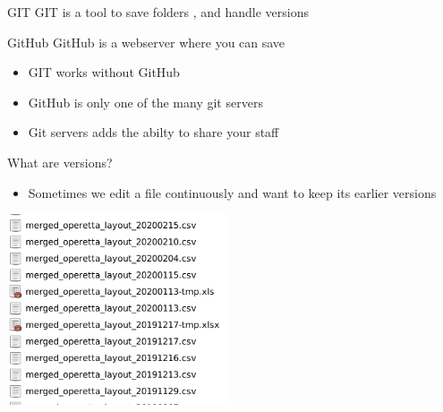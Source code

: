 \documentclass[aspectratio=169]{beamer}
\begin{document}

\begin{frame}

\begin{block}{GIT}
GIT is a  tool to save folders , and handle versions
\end{block}


\begin{block}{GitHub}
GitHub is a webserver where you can save 
\end{block}



\begin{itemize}
\item GIT works without GitHub
\item GitHub is only one of the many git servers
\item Git servers adds the abilty to share your staff
\end{itemize}
 
\end{frame}



\begin{frame}

What are versions? 


\begin{itemize}
\item Sometimes we edit a file continuously and want to keep its earlier versions
\end{itemize}
\includegraphics[height=160pt]{pictures/Screenshot_2020-02-25_17-47-03-ugly_folder-zoom_in.png}

\end{frame}
\end{document}
